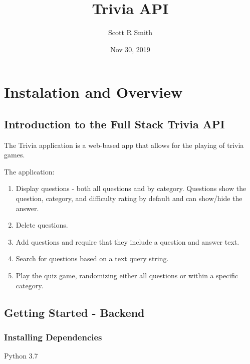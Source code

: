 \documentclass[letterpaper,10pt,english]{sphinxmanual}
\title{Trivia API}
\date{Nov 30, 2019}
\author{Scott R Smith}
\begin{document}
\pagestyle{empty}
\sphinxmaketitle
\pagestyle{plain}
\sphinxtableofcontents
\pagestyle{normal}
\label{\detokenize{index::doc}}



\chapter{Instalation and Overview}
\label{\detokenize{index:instalation-and-overview}}

\section{Introduction to the Full Stack Trivia API}
\label{\detokenize{index:introduction-to-the-full-stack-trivia-api}}
The Trivia application is a web-based app that allows for the playing of trivia games.

The application:
\begin{enumerate}
%
\item {} 
Display questions - both all questions and by category. Questions show the question, category, and difficulty rating by default and can show/hide the answer.

\item {} 
Delete questions.

\item {} 
Add questions and require that they include a question and answer text.

\item {} 
Search for questions based on a text query string.

\item {} 
Play the quiz game, randomizing either all questions or within a specific category.

\end{enumerate}


\section{Getting Started - Backend}
\label{\detokenize{index:getting-started-backend}}

\subsection{Installing Dependencies}
\label{\detokenize{index:installing-dependencies}}
Python 3.7
\end{document}
